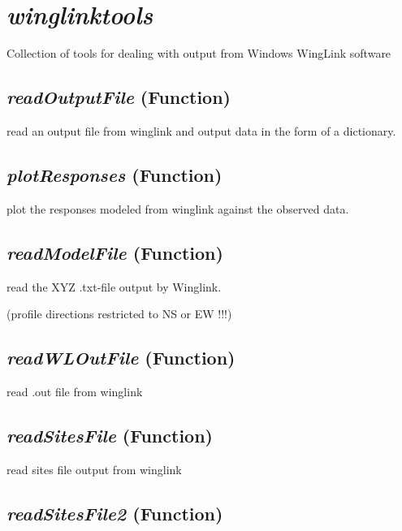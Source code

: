 
\section{\textit{winglinktools} }
\label{sec:modeling.winglinktools}


Collection of tools for dealing with output from Windows WingLink software

\subsection{\textit{readOutputFile} (Function)}
\label{ssec:.modeling.winglinktools.readOutputFile}

read an output file from winglink and output data
    in the form of a dictionary.

\subsection{\textit{plotResponses} (Function)}
\label{ssec:.modeling.winglinktools.plotResponses}

plot the responses modeled from winglink against the
    observed data.

\subsection{\textit{readModelFile} (Function)}
\label{ssec:.modeling.winglinktools.readModelFile}

read  the XYZ .txt-file output by Winglink.

(profile directions restricted to NS or EW !!!)

\subsection{\textit{readWLOutFile} (Function)}
\label{ssec:.modeling.winglinktools.readWLOutFile}

read .out file from winglink

\subsection{\textit{readSitesFile} (Function)}
\label{ssec:.modeling.winglinktools.readSitesFile}

read sites file output from winglink

\subsection{\textit{readSitesFile2} (Function)}
\label{ssec:.modeling.winglinktools.readSitesFile2}

